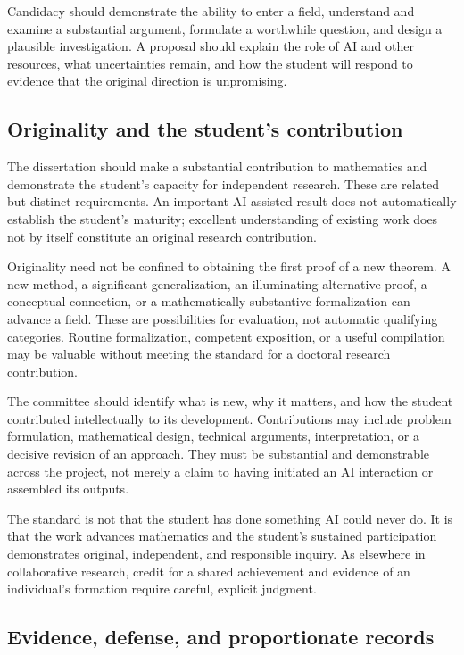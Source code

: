 \documentclass[11pt]{article}
\begin{document}
Candidacy should demonstrate the ability to enter a field, understand and examine a
substantial argument, formulate a worthwhile question, and design a plausible
investigation. A proposal should explain the role of AI and other resources, what
uncertainties remain, and how the student will respond to evidence that the original
direction is unpromising.

\subsection{Originality and the student's contribution}

The dissertation should make a substantial contribution to mathematics and demonstrate
the student's capacity for independent research. These are related but distinct
requirements. An important AI-assisted result does not automatically establish the
student's maturity; excellent understanding of existing work does not by itself
constitute an original research contribution.

Originality need not be confined to obtaining the first proof of a new theorem. A new
method, a significant generalization, an illuminating alternative proof, a conceptual
connection, or a mathematically substantive formalization can advance a field.
These are possibilities for evaluation, not automatic qualifying categories.
Routine formalization, competent exposition, or a useful compilation may be valuable
without meeting the standard for a doctoral research contribution.

The committee should identify what is new, why it matters, and how the student
contributed intellectually to its development. Contributions may include problem
formulation, mathematical design, technical arguments, interpretation, or a decisive
revision of an approach. They must be substantial and demonstrable across the project,
not merely a claim to having initiated an AI interaction or assembled its outputs.

The standard is not that the student has done something AI could never do. It is that
the work advances mathematics and the student's sustained participation demonstrates
original, independent, and responsible inquiry. As elsewhere in collaborative research,
credit for a shared achievement and evidence of an individual's formation require
careful, explicit judgment.

\subsection{Evidence, defense, and proportionate records}
\end{document}
